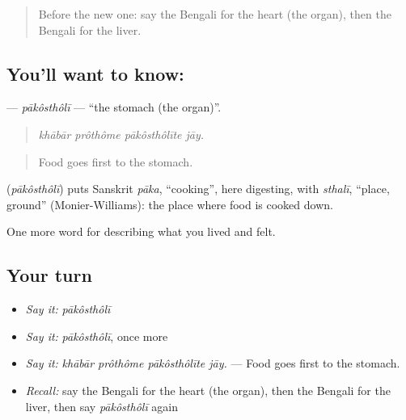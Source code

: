 \begin{quote}
Before the new one: say the Bengali for the heart (the organ), then the Bengali for the liver.
\end{quote}

\subsection*{You'll want to know: }
\textbf{} — \emph{pākôsthôlī} — \textquotedblleft{}the stomach (the organ)\textquotedblright{}.

\begin{quote}
   
\end{quote}

\begin{quote}
\emph{khābār prôthôme pākôsthôlīte jāy.}
\end{quote}

\begin{quote}
Food goes first to the stomach.
\end{quote}

\begin{cousinweb}
\textbf{} (\emph{pākôsthôlī}) puts Sanskrit \emph{pāka}, \textquotedblleft{}cooking\textquotedblright{}, here digesting, with \emph{sthalī}, \textquotedblleft{}place, ground\textquotedblright{} (Monier-Williams): the place where food is cooked down.
\end{cousinweb}

\begin{grammarlens}[title={What you've built}]
One more word for describing what you lived and felt.
\end{grammarlens}

\subsection*{Your turn}
\begin{itemize}
\raggedright
  \item \emph{Say it:} \emph{pākôsthôlī}
  \item \emph{Say it:} \emph{pākôsthôlī}, once more
  \item \emph{Say it:} \emph{khābār prôthôme pākôsthôlīte jāy.} — Food goes first to the stomach.
  \item \emph{Recall:} say the Bengali for the heart (the organ), then the Bengali for the liver, then say \emph{pākôsthôlī} again
\end{itemize}

